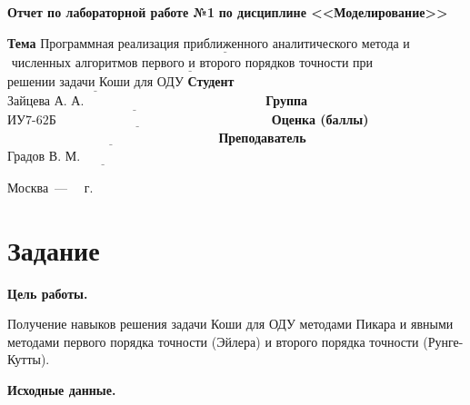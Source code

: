 \documentclass[12pt]{report}
\begin{document}
\begin{titlepage}
		\begin{center}
			\noindent\begin{minipage}{1.1\textwidth}\centering
				\Large\textbf{  Отчет по лабораторной работе №1}\newline
				\textbf{по дисциплине <<Моделирование>>}\newline
			\end{minipage}
		\end{center}
		
		\noindent\textbf{Тема} $\underline{\text{Программная реализация приближенного аналитического метода и}}$\newline   
		$\underline{\text{		численных алгоритмов первого и второго порядков точности при}}$\newline
		$\underline{\text{решении задачи Коши для ОДУ}}$\newline\newline
		\noindent\textbf{Студент} $\underline{\text{Зайцева А. А.~~~~~~~~~~~~~~~~~~~~~~~~~~~~~~~~~~~~~~~~~~}}$\newline\newline
		\noindent\textbf{Группа} $\underline{\text{ИУ7-62Б~~~~~~~~~~~~~~~~~~~~~~~~~~~~~~~~~~~~~~~~~~~~~~~~~~}}$\newline\newline
		\noindent\textbf{Оценка (баллы)} $\underline{\text{~~~~~~~~~~~~~~~~~~~~~~~~~~~~~~~~~~~~~~~~~~~~~~~~~}}$\newline\newline
		\noindent\textbf{Преподаватель} $\underline{\text{Градов В. М.~~~~~~~~~~~~~~~~~~~~~~~~~~~~}}$\newline\newline\newline
		
		\begin{center}
			\vfill
			Москва~---~\the\year
			~г.
		\end{center}
	\end{titlepage}

\chapter{Задание}

\textbf{Цель работы.} 

Получение навыков решения задачи Коши для ОДУ методами Пикара и явными методами первого порядка точности (Эйлера) и второго порядка точности (Рунге-Кутты).

\textbf{Исходные данные.} 
\end{document}
